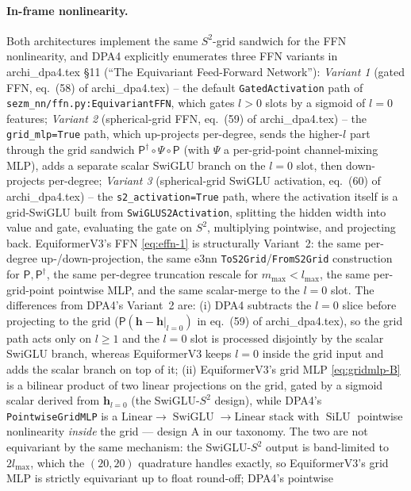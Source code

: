 \documentclass[11pt,a4paper]{article}
\DeclareMathOperator{\SiLU}{SiLU}
\DeclareMathOperator{\SwiGLU}{SwiGLU}
\newcommand{\Sph}{S^2}
\newcommand{\bh}{\bm{h}}
\newcommand{\lmax}{l_{\max}}
\newcommand{\mmax}{m_{\max}}
\theoremstyle{plain}
\theoremstyle{definition}
\theoremstyle{remark}
\begin{document}
\paragraph{In-frame nonlinearity.}
Both architectures implement the same $\Sph$-grid sandwich for the FFN
nonlinearity, and DPA4 explicitly enumerates three FFN variants in
archi\_dpa4.tex \S11 (``The Equivariant Feed-Forward Network''): \emph{Variant
    1} (gated FFN, eq.~(58) of archi\_dpa4.tex) -- the default
\texttt{GatedActivation} path of \texttt{sezm\_nn/ffn.py:EquivariantFFN}, which
gates $l>0$ slots by a sigmoid of $l=0$ features; \emph{Variant 2}
(spherical-grid FFN, eq.~(59) of archi\_dpa4.tex) -- the
\texttt{grid\_mlp=True} path, which up-projects per-degree, sends the
higher-$l$ part through the grid sandwich
$\mathsf{P}^{\dagger}\circ\Psi\circ\mathsf{P}$ (with $\Psi$ a per-grid-point
channel-mixing MLP), adds a separate scalar SwiGLU branch on the $l=0$ slot,
then down-projects per-degree; \emph{Variant 3} (spherical-grid SwiGLU
activation, eq.~(60) of archi\_dpa4.tex) -- the \texttt{s2\_activation=True}
path, where the activation itself is a grid-SwiGLU built from
\texttt{SwiGLUS2Activation}, splitting the hidden width into value and gate,
evaluating the gate on $\Sph$, multiplying pointwise, and projecting back.
EquiformerV3's FFN \eqref{eq:effn-1} is structurally Variant~2: the same
per-degree up-/down-projection, the same e3nn
\texttt{ToS2Grid}/\texttt{FromS2Grid} construction for
$\mathsf{P},\mathsf{P}^{\dagger}$, the same per-degree truncation rescale for
$\mmax<\lmax$, the same per-grid-point pointwise MLP, and the same scalar-merge
to the $l=0$ slot. The differences from DPA4's Variant~2 are: (i) DPA4
subtracts the $l=0$ slice before projecting to the grid
($\mathsf{P}(\bh-\bh|_{l=0})$ in eq.~(59) of archi\_dpa4.tex), so the grid path
acts only on $l\ge 1$ and the $l=0$ slot is processed disjointly by the scalar
SwiGLU branch, whereas EquiformerV3 keeps $l=0$ inside the grid input and adds
the scalar branch on top of it; (ii) EquiformerV3's grid MLP
\eqref{eq:gridmlp-B} is a bilinear product of two linear projections on the
grid, gated by a sigmoid scalar derived from $\bh_{l=0}$ (the SwiGLU-$\Sph$
design), while DPA4's \texttt{PointwiseGridMLP} is a
$\mathrm{Linear}\to\SwiGLU\to\mathrm{Linear}$ stack with $\SiLU$ pointwise
nonlinearity \emph{inside} the grid — design A in our taxonomy. The two are not
equivariant by the same mechanism: the SwiGLU-$\Sph$ output is band-limited to
$2\lmax$, which the $(20,20)$ quadrature handles exactly, so EquiformerV3's
grid MLP is strictly equivariant up to float round-off; DPA4's pointwise
\end{document}
